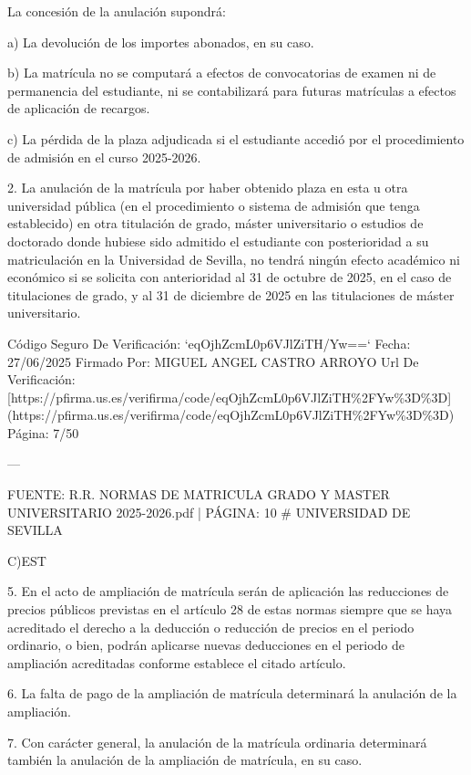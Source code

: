 \documentclass{article}
\begin{document}
\begin{itemize}
\begin{itemize}
\begin{scriptsize}
                  La concesión de la anulación supondrá:

                  a) La devolución de los importes abonados, en su caso.

                  b) La matrícula no se computará a efectos de convocatorias de examen ni de permanencia del estudiante, ni se contabilizará para futuras matrículas a efectos de aplicación de recargos.

                  c) La pérdida de la plaza adjudicada si el estudiante accedió por el procedimiento de admisión en el curso 2025-2026.

                  2. La anulación de la matrícula por haber obtenido plaza en esta u otra universidad pública (en el procedimiento o sistema de admisión que tenga establecido) en otra titulación de grado, máster universitario o estudios de doctorado donde hubiese sido admitido el estudiante con posterioridad a su matriculación en la Universidad de Sevilla, no tendrá ningún efecto académico ni económico si se solicita con anterioridad al 31 de octubre de 2025, en el caso de titulaciones de grado, y al 31 de diciembre de 2025 en las titulaciones de máster universitario.

                  Código Seguro De Verificación: `eqOjhZcmL0p6VJlZiTH/Yw==`
                  Fecha: 27/06/2025
                  Firmado Por: MIGUEL ANGEL CASTRO ARROYO
                  Url De Verificación: [https://pfirma.us.es/verifirma/code/eqOjhZcmL0p6VJlZiTH\%2FYw\%3D\%3D](https://pfirma.us.es/verifirma/code/eqOjhZcmL0p6VJlZiTH\%2FYw\%3D\%3D)
                  Página: 7/50

                  ---

                  FUENTE: R.R. NORMAS DE MATRICULA GRADO Y MASTER UNIVERSITARIO 2025-2026.pdf | PÁGINA: 10
                  \# UNIVERSIDAD DE SEVILLA

                  C)EST

                  5. En el acto de ampliación de matrícula serán de aplicación las reducciones de precios públicos previstas en el artículo 28 de estas normas siempre que se haya acreditado el derecho a la deducción o reducción de precios en el periodo ordinario, o bien, podrán aplicarse nuevas deducciones en el periodo de ampliación acreditadas conforme establece el citado artículo.

                  6. La falta de pago de la ampliación de matrícula determinará la anulación de la ampliación.

                  7. Con carácter general, la anulación de la matrícula ordinaria determinará también la anulación de la ampliación de matrícula, en su caso.


\end{scriptsize}
\end{itemize}
\end{itemize}
\end{document}
